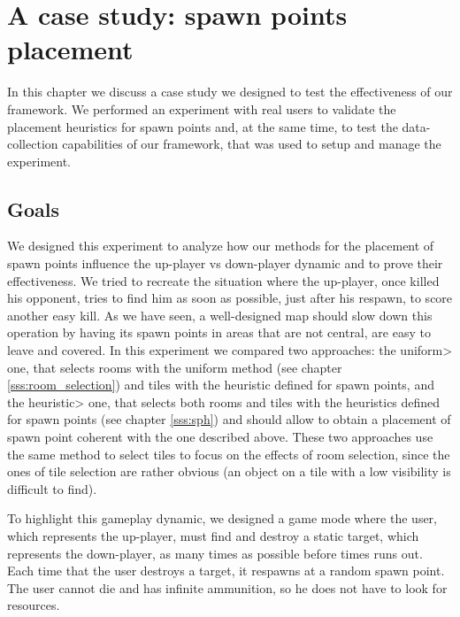 \chapter{A case study: spawn points placement}


In this chapter we discuss a case study we designed to test the effectiveness of our framework. We
performed an experiment with real users to validate the placement heuristics for spawn points and, at the same time, to test the data-collection capabilities of our framework, that was used to setup and manage the experiment.


\section{Goals}

We designed this experiment to analyze how our methods for the placement of spawn points influence the up-player vs down-player dynamic and to prove their effectiveness. We tried to recreate the situation where the up-player, once killed his opponent, tries to find him as soon as possible, just after his respawn, to score another easy kill. As we have seen, a well-designed map should slow down this operation by having its spawn points in areas that are not central, are easy to leave and covered. In this experiment we compared two approaches: the \<uniform> one, that selects rooms with the uniform method (see chapter \ref{sss:room_selection}) and tiles with the heuristic defined for spawn points, and the \<heuristic> one, that selects both rooms and tiles with the heuristics defined for spawn points (see chapter \ref{sss:sph}) and should allow to obtain a placement of spawn point coherent with the one described above. These two approaches use the same method to select tiles to focus on the effects of room selection, since the ones of tile selection are rather obvious (an object on a tile with a low visibility is difficult to find).

\par

To highlight this gameplay dynamic, we designed a game mode where the user, which represents the up-player, must find and destroy a static target, which represents the down-player, as many times as possible before times runs out. Each time that the user destroys a target, it respawns at a random spawn point. The user cannot die and has infinite ammunition, so he does not have to look for resources.


